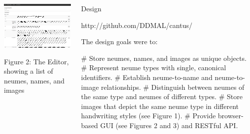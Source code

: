 \documentclass[final]{beamer}
\newlength{\onecolwid}
\newcommand{\blockSpace}{\vskip 0.75ex}
\begin{document}
\begin{frame}[fragile,t]
\begin{columns}
\begin{column}{\onecolwid}
\begin{block}{}
\centering
\includegraphics[width=\onecolwid]{images/neume-list-interface_cropped.png} 

Figure 2: The Editor, showing a list of neumes, names, and images
\end{block}
\end{column}

\begin{column}{\onecolwid}
\begin{block}{Design}
\begin{center}
\vspace{-0.25\baselineskip}
\small{http://github.com/DDMAL/cantus/}
\normalsize
\vspace{0.25\baselineskip}
\end{center}

\raggedright

The design goals were to:

\begin{easylist}[itemize]
# Store neumes, names, and images as unique objects.
# Represent neume types with single, canonical identifiers.
# Establish neume-to-name and neume-to-image relationships.
# Distinguish between neumes of the same type and neumes of different types.
# Store images that depict the same neume type in different handwriting styles (see Figure 1).
# Provide browser-based GUI (see Figures 2 and 3) and RESTful API.
\end{easylist}


\end{block}
\end{column}
\end{columns}
\end{frame}
\end{document}
